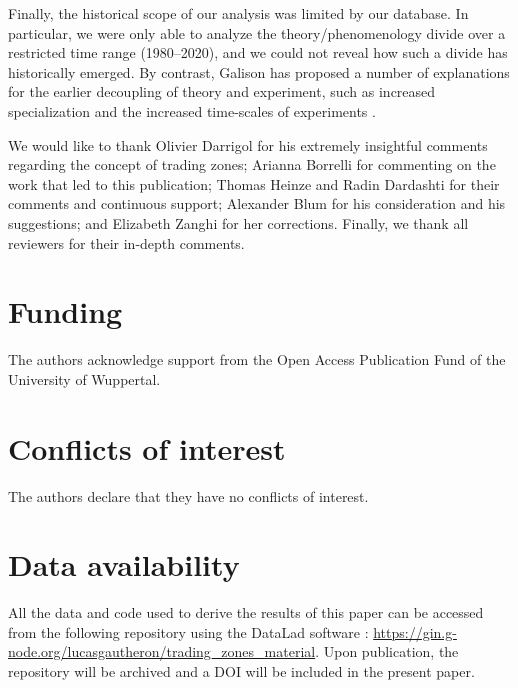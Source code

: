 \documentclass[smallextended]{svjour3}
\begin{document}
Finally, the historical scope of our analysis was limited by our database. In particular, we were only able to analyze the theory/phenomenology divide over a restricted time range (1980--2020), and we could not reveal how such a divide has historically emerged. By contrast, Galison has proposed a number of explanations for the earlier decoupling of theory and experiment, such as increased specialization and the increased time-scales of experiments \citep[p.~138]{galison1987how}.

\printglossary[type=\acronymtype,title=List of abbreviations]




\begin{acknowledgements}
We would like to thank Olivier Darrigol for his extremely insightful comments regarding the concept of trading zones; Arianna Borrelli for commenting on the work that led to this publication; Thomas Heinze and  Radin Dardashti for their comments and continuous support; Alexander Blum for his consideration and his suggestions; and Elizabeth Zanghi for her corrections. Finally, we thank all reviewers for their in-depth comments.
\end{acknowledgements}

\section*{Funding}

The authors acknowledge support from the Open Access Publication Fund of the University of Wuppertal.

\section*{Conflicts of interest}

The authors declare that they have no conflicts of interest.

\section*{Data availability}

All the data and code used to derive the results of this paper can be accessed from the following repository using the DataLad software \citep{datalad_paper}: \url{https://gin.g-node.org/lucasgautheron/trading_zones_material}. Upon publication, the repository will be archived and a DOI will be included in the present paper.

% 
\printbibliography
\end{document}
